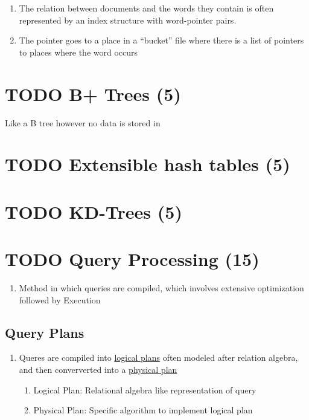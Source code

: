 \documentclass[11pt]{article}
\begin{document}
\begin{enumerate}
\item The relation between documents and the words they contain is
      often represented by an index structure with word-pointer pairs.
\item The pointer goes to a place in a ``bucket'' file where there is a
      list of pointers to places where the word occurs
\end{enumerate}
\section{\textbf{TODO} B+ Trees (5)}
\label{sec-9}

  Like a B tree however no data is stored in 
\section{\textbf{TODO} Extensible hash tables (5)}
\label{sec-10}

\section{\textbf{TODO} KD-Trees (5)}
\label{sec-11}

\section{\textbf{TODO} Query Processing (15)}
\label{sec-12}

\begin{enumerate}
\item Method in which queries are compiled, which involves extensive
     optimization followed by Execution
\end{enumerate}
\subsection{Query Plans}
\label{sec-12.1}

\begin{enumerate}
\item Queres are compiled into \underline{logical plans} often modeled after
      relation algebra, and then conververted into a \underline{physical plan}

\begin{enumerate}
\item Logical Plan: Relational algebra like representation of query
\item Physical Plan: Specific algorithm to implement logical plan
\end{enumerate}

\end{enumerate}
\end{document}
